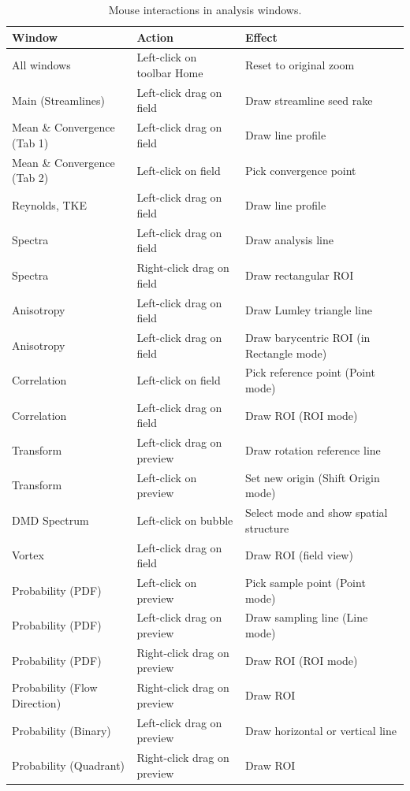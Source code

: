 \documentclass[11pt, a4paper]{report}
\begin{document}
\begin{table}[htbp]
\centering
\caption{Mouse interactions in analysis windows.}
\begin{tabular}{lp{4cm}p{6.5cm}}
\toprule
\textbf{Window} & \textbf{Action} & \textbf{Effect} \\
\midrule
All windows       & Left-click on toolbar Home & Reset to original zoom \\
Main (Streamlines) & Left-click drag on field & Draw streamline seed rake \\
Mean \& Convergence (Tab 1) & Left-click drag on field & Draw line profile \\
Mean \& Convergence (Tab 2) & Left-click on field & Pick convergence point \\
Reynolds, TKE     & Left-click drag on field & Draw line profile \\
Spectra           & Left-click drag on field & Draw analysis line \\
Spectra           & Right-click drag on field & Draw rectangular ROI \\
Anisotropy        & Left-click drag on field & Draw Lumley triangle line \\
Anisotropy        & Left-click drag on field & Draw barycentric ROI (in Rectangle mode) \\
Correlation       & Left-click on field & Pick reference point (Point mode) \\
Correlation       & Left-click drag on field & Draw ROI (ROI mode) \\
Transform         & Left-click drag on preview & Draw rotation reference line \\
Transform         & Left-click on preview & Set new origin (Shift Origin mode) \\
DMD Spectrum      & Left-click on bubble & Select mode and show spatial structure \\
Vortex            & Left-click drag on field & Draw ROI (field view) \\
Probability (PDF) & Left-click on preview & Pick sample point (Point mode) \\
Probability (PDF) & Left-click drag on preview & Draw sampling line (Line mode) \\
Probability (PDF) & Right-click drag on preview & Draw ROI (ROI mode) \\
Probability (Flow Direction) & Right-click drag on preview & Draw ROI \\
Probability (Binary) & Left-click drag on preview & Draw horizontal or vertical line \\
Probability (Quadrant) & Right-click drag on preview & Draw ROI \\
\bottomrule
\end{tabular}
\end{table}
\end{document}

